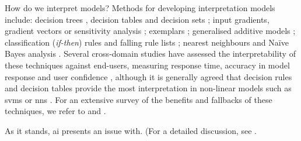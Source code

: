 How do we interpret models? Methods for developing interpretation models include: decision trees \citep{Breiman:1984tu,Hastie:2001wp,Craven:1995wg,Quinlan:1993vi,Rokach:2008wc}, decision tables \citep{Lima:2009tm,Baesens:2004we} and decision sets \citep{Lakkaraju:2016ka,Narayanan:2018ud}; input gradients, gradient vectors or sensitivity analysis \citep{Selvaraju:2017bk,Ribeiro:2016gg,Lei:2016wi,Ross:2017vn,Baehrens:2010tj}; exemplars \citep{Kim:2014ui,Frey:2007hs}; generalised additive models \citep{Caruana:2015jk}; classification (\textit{if-then}) rules \citep{Thrun:1996wh,Bramer:2007vg,Clark:1991vi,Otero:2013ul,Witten:2016ut} and falling rule lists \citep{Singh:2016wu}; nearest neighbours \citep{Martens:2011uh,Sen:1995uk,Suri:2007wl,Wettschereck:1997vw,Zhang:1992vl} and Na\"{i}ve Bayes analysis \citep{Bellazzi:2008tv,Lavrac:1999tf,Kononenko:1993td,Zupan:2000tp,Michie:1994wi,Friedman:1997vs,Cheng:2001vw,Heckerman:2000uw}. Several cross-domain studies have assessed the interpretability of these techniques against end-users, measuring response time, accuracy in model response and user confidence \citep{Huysmans:2011gq,Hayete:2005tn,Allahyari:2011ud,Subramanian:1992ue,Schwabacher:2001wc,Freitas:2010vk,Martens:2011uh,Verbeke:2011vo}, although it is generally agreed that decision rules and decision tables provide the most interpretation in non-linear models such as \glspl{svm} or \glspl{nn} \citep{Freitas:2010vk,Martens:2011uh,Verbeke:2011vo}. For an extensive survey of the benefits and fallbacks of these techniques, we refer to \citet{Freitas:2014ic} and \citet{DoshiVelez:2017wu}.


As it stands, \gls{ai} presents an issue with. (For a detailed discussion, see \citet{DoshiVelez:2017vm}.
